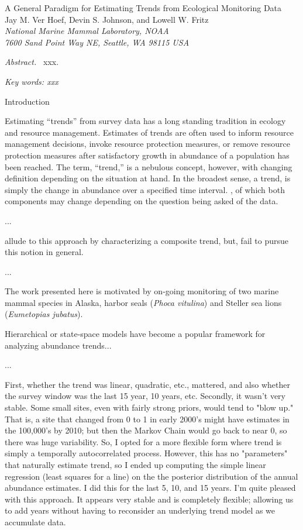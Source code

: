 \documentclass[12pt,letter]{article}
\begin{document}
\begin{center}
\Large A General Paradigm for Estimating Trends from Ecological Monitoring Data
\bigskip\\
\normalsize
{\sc Jay M. Ver Hoef\footnotemark[1], Devin S. Johnson, and Lowell W. Fritz}\smallskip\\
{\em National Marine Mammal Laboratory, NOAA\\
7600 Sand Point Way NE, Seattle,
WA 98115 USA }\\ \medskip
\end{center}

\raggedright \setlength{\parindent}{0.3in}
\renewcommand{\baselinestretch}{1.7}\normalsize
{}
 \linenumbers

{\em Abstract.\ } xxx.

{\em Key words: xxx}

\centerline{\sc Introduction}

Estimating ``trends'' from survey data has a long standing tradition in ecology and resource management. Estimates of trends are often used to inform resource management decisions, invoke resource protection measures, or remove resource protection measures after satisfactory growth in abundance of a population has been reached. The term, ``trend,'' is a nebulous concept, however, with changing definition depending on the situation at hand. In the broadest sense, a trend, is simply the change in abundance over a specified time interval. , of which both components may change depending on the question being asked of the data.   

...


\citet{Link:2002zd} allude to this approach by characterizing a composite trend, but, fail to pursue this notion in general.


...

The work presented here is motivated by on-going monitoring of two marine mammal species in Alaska, harbor seals ({\it Phoca vitulina}) and Steller sea lions ({\it Eumetopias jubatus}).

Hierarchical or state-space models have become a popular framework for analyzing abundance trends...

...

 First, whether the trend was linear, quadratic, etc., mattered, and also whether the survey window was the last 15 year, 10 years, etc.  Secondly, it wasn't very stable.  Some small sites, even with fairly strong priors, would tend to "blow up."  That is, a site that changed from 0 to 1 in early 2000's might have estimates in the 100,000's by 2010; but then the Markov Chain would go back to near 0, so there was huge variability.  So, I opted for a more flexible form where trend is simply a temporally autocorrelated process.  However, this has no "parameters" that naturally estimate trend, so I ended up computing the simple linear regression (least squares for a line) on the the posterior distribution of the annual abundance estimates.  I did this for the last 5, 10, and 15 years.  I'm quite pleased with this approach.  It appears very stable and is completely flexible; allowing us to add years without having to reconsider an underlying trend model as we accumulate data.
\end{document}
